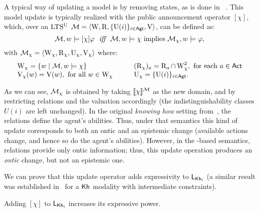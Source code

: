

A typical way of updating a model  
is by removing states, as is done in \PAL~\cite{Plaza89:lopc,DELbook}.  This model update is typically realized with the public announcement operator $[\chi]$,
which, over an $\textup{LTS$^\text{\textup{U}}$}$ $\mathcal{M}=\langle \operatorname{W},\operatorname{R},\{ \operatorname{U}(i) \}_{i\in{\rm \sf Agt}},\operatorname{V} \rangle$, can be defined as:
\[
\modults,w\models[\chi]\varphi \ \ \iff \ \  \modults,w\models\chi \mbox{ implies } \modults_{\chi},w\models\varphi,
\]
with $\mathcal{M}_\chi=\langle \operatorname{W}_\chi,\operatorname{R}_\chi,\operatorname{U}_\chi,\operatorname{V}_\chi \rangle$ where:
\[
\begin{array}{l@{\quad \quad \quad }l}
\W_\chi = \set{w \mid \modults,w\models\chi} & (\R_\chi)_a = \R_a \cap \W_\chi^2, \mbox{ for each } a\in\ACT \\
\V_\chi(w) = \V(w), \mbox{ for all } w\in\W_\chi & \Unc_\chi = \set{\Unc(i)}_{i\in\AGT}.
\end{array}	
\]

As we can see, $\mathcal{M}_\chi$ is obtained by taking $\llbracket \chi \rrbracket^{\mathcal{M}}$ as the new domain, and by restricting relations and the valuation accordingly (the indistinguishability classes $U(i)$ are left unchanged).
In the original \emph{knowing how} setting from~\cite{Wang15lori}, the relations define the agent's abilities. Thus, under that semantics this kind of update corresponds to both an ontic and an epistemic change (available actions change, and hence so do the agent's abilities). However, in the \ults-based semantics, relations provide only ontic information; thus, this update operation produces an \emph{ontic} change, but not an epistemic one.

We can prove that this update operator adds expressivity to $\mathsf{L}_{{\sf Kh}_i}$ (a similar result was established in~\cite{Wang2016} for a ${\sf Kh}$ modality with intermediate constraints).

\medskip 

\begin{proposition}\label{prop:pal-exp}
Adding $[\chi]$ to $\mathsf{L}_{{\sf Kh}_i}$ increases its expressive power.
\end{proposition}

